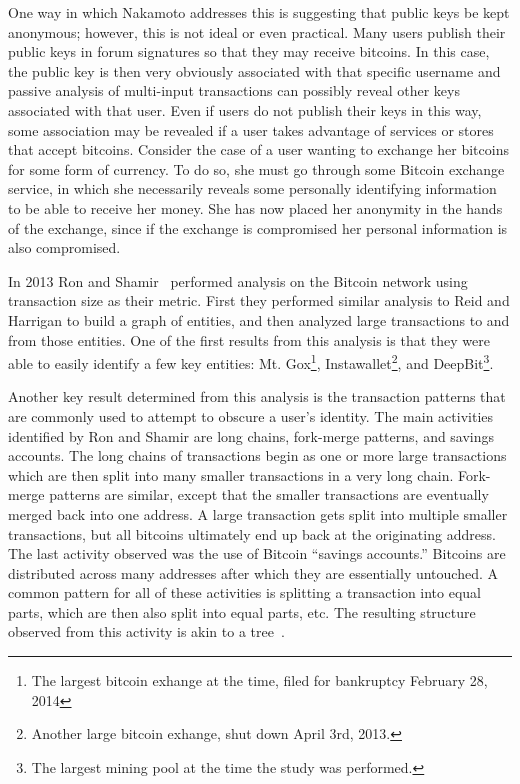 \documentclass[11pt]{article}
\begin{document}
One way in which Nakamoto addresses this is suggesting that public keys be kept anonymous; however, this is not ideal or
even practical. Many users publish their public keys in forum signatures so that they may receive bitcoins.  In this
case, the public key is then very obviously associated with that specific username and passive analysis of multi-input
transactions can possibly reveal other keys associated with that user. Even if users do not publish their keys in this
way, some association may be revealed if a user takes advantage of services or stores that accept bitcoins. Consider the
case of a user wanting to exchange her bitcoins for some form of currency. To do so, she must go through some Bitcoin
exchange service, in which she necessarily reveals some personally identifying information to be able to receive her
money. She has now placed her anonymity in the hands of the exchange, since if the exchange is compromised her personal
information is also compromised.

In 2013 Ron and Shamir~\cite{ron13} performed analysis on the Bitcoin network using transaction size as their metric.
First they performed similar analysis to Reid and Harrigan to build a graph of entities, and then analyzed large
transactions to and from those entities. One of the first results from this analysis is that they were able to easily
identify a few key entities: Mt.  Gox\footnote{The largest bitcoin exhange at the time, filed for bankruptcy February
28, 2014}, Instawallet\footnote{Another large bitcoin exhange, shut down April 3rd, 2013.}, and DeepBit\footnote{The
largest mining pool at the time the study was performed.}.

Another key result determined from this analysis is the transaction patterns that are commonly used to attempt to
obscure a user's identity. The main activities identified by Ron and Shamir are long chains, fork-merge patterns, and
savings accounts. The long chains of transactions begin as one or more large transactions which are then split into many
smaller transactions in a very long chain. Fork-merge patterns are similar, except that the smaller transactions are
eventually merged back into one address. A large transaction gets split into multiple smaller transactions, but all
bitcoins ultimately end up back at the originating address. The last activity observed was the use of Bitcoin ``savings
accounts.'' Bitcoins are distributed across many addresses after which they are essentially untouched. A common pattern
for all of these activities is splitting a transaction into equal parts, which are then also split into equal parts,
etc. The resulting structure observed from this activity is akin to a tree~\cite{ron13}.
\end{document}
